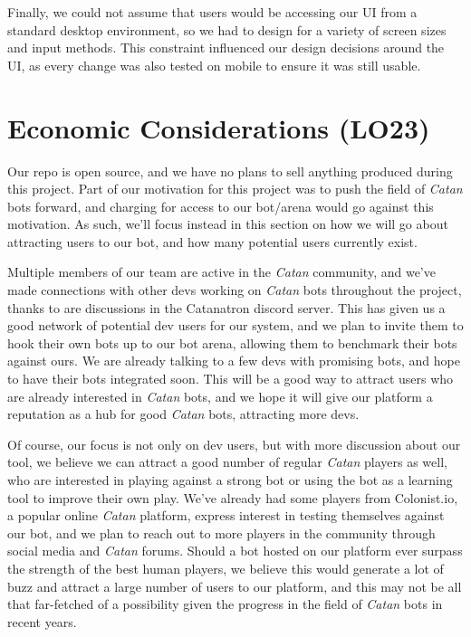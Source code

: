 \documentclass{article}
\begin{document}
Finally, we could not assume that users would be accessing our UI from a standard desktop environment,
so we had to design for a variety of screen sizes and input methods.
This constraint influenced our design decisions around the UI, as every change was also tested on mobile
to ensure it was still usable.


\section{Economic Considerations (LO23)}


Our repo is open source, and we have no plans to sell anything produced during this project.
Part of our motivation for this project was to push the field of \emph{Catan} bots forward, and charging for
access to our bot/arena would go against this motivation.
As such, we'll focus instead in this section on how we will go about attracting users to our bot,
and how many potential users currently exist.

Multiple members of our team are active in the \emph{Catan} community, and we've made connections with other
devs working on \emph{Catan} bots throughout the project, thanks to are discussions in the Catanatron discord server.
This has given us a good network of potential dev users for our system, and we plan to invite them
to hook their own bots up to our bot arena, allowing them to benchmark their bots against ours.
We are already talking to a few devs with promising bots, and hope to have their bots integrated soon.
This will be a good way to attract users who are already interested in \emph{Catan} bots, and we hope it will
give our platform a reputation as a hub for good \emph{Catan} bots, attracting more devs.

Of course, our focus is not only on dev users, but with more discussion about our tool, we believe
we can attract a good number of regular \emph{Catan} players as well, who are interested in playing against a strong bot
or using the bot as a learning tool to improve their own play.
We've already had some players from Colonist.io, a popular online \emph{Catan} platform, express interest in
testing themselves against our bot, and we plan to reach out to more players in the community through
social media and \emph{Catan} forums.
Should a bot hosted on our platform ever surpass the strength of the best human players, we believe this would
generate a lot of buzz and attract a large number of users to our platform, and this may not be all
that far-fetched of a possibility given the progress in the field of \emph{Catan} bots in recent years.
\end{document}
